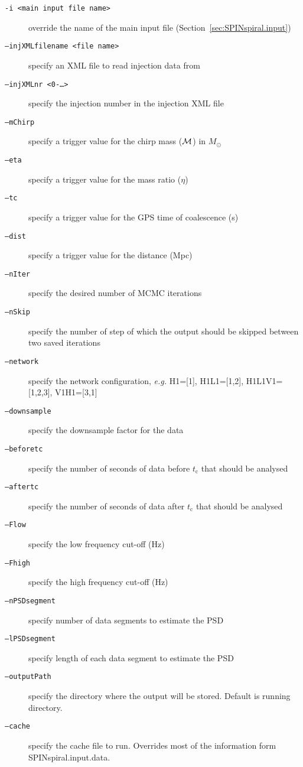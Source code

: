 \documentclass[10pt]{article}
\begin{document}
\begin{description}
  \item[\texttt{-i <main input file name>}] override the name of the main input file (Section~\ref{sec:SPINspiral.input})
  \item[\texttt{--injXMLfilename <file name>}] specify an XML file to read injection data from
  \item[\texttt{--injXMLnr <0-\ldots>}] specify the injection number in the injection XML file

  \item[\texttt{--mChirp}] specify a trigger value for the chirp mass ($\cal{M}$) in $M_\odot$
  \item[\texttt{--eta}] specify a trigger value for the mass ratio ($\eta$)
  \item[\texttt{--tc}] specify a trigger value for the GPS time of coalescence (s)
  \item[\texttt{--dist}] specify a trigger value for the distance (Mpc)
    
  \item[\texttt{--nIter}] specify the desired number of MCMC iterations
  \item[\texttt{--nSkip}] specify the number of step of which the output should be skipped between two saved iterations
  \item[\texttt{--network}] specify the network configuration, \textit{e.g.} H1=[1], H1L1=[1,2], H1L1V1=[1,2,3], V1H1=[3,1]
  \item[\texttt{--downsample}] specify the downsample factor for the data
  \item[\texttt{--beforetc}] specify the number of seconds of data before $t_\mathrm{c}$ that should be analysed
  \item[\texttt{--aftertc}] specify the number of seconds of data after $t_\mathrm{c}$ that should be analysed
  \item[\texttt{--Flow}] specify the low frequency cut-off (Hz)
  \item[\texttt{--Fhigh}] specify the high frequency cut-off (Hz)
  \item[\texttt{--nPSDsegment}] specify number of data segments to estimate the PSD
  \item[\texttt{--lPSDsegment}] specify length of each data segment to estimate the PSD
  \item[\texttt{--outputPath}] specify the directory where the output will be stored. Default is running directory.
  \item[\texttt{--cache}] specify the cache file to run. Overrides most of the information form SPINspiral.input.data.

  
\end{description}
  
\end{document}
